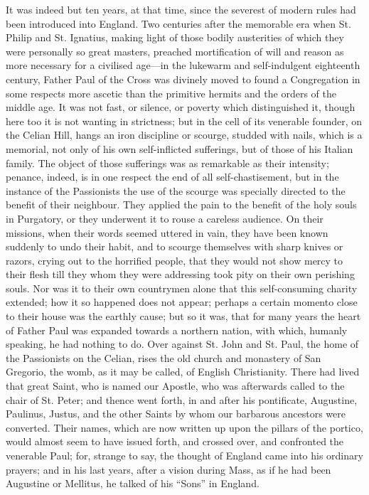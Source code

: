 It was indeed but ten years, at that time, since the severest of
modern rules had been introduced into England. Two centuries after the
memorable era when St. Philip and St. Ignatius, making light of those
bodily austerities of which they were personally so great masters,
preached mortification of will and reason as more necessary for a
civilised age—in the lukewarm and self-indulgent eighteenth century,
Father Paul of the Cross was divinely moved to found a Congregation in
some respects more ascetic than the primitive hermits and the orders
of the middle age. It was not fast, or silence, or poverty which
distinguished it, though here too it is not wanting in strictness; but
in the cell of its venerable founder, on the Celian Hill, hangs an
iron discipline or scourge, studded with nails, which is a memorial,
not only of his own self-inflicted sufferings, but of those of his
Italian family. The object of those sufferings was as remarkable as
their intensity; penance, indeed, is in one respect the end of all
self-chastisement, but in the instance of the Passionists the use of
the scourge was specially directed to the benefit of their neighbour.
They applied the pain to the benefit of the holy souls in Purgatory,
or they underwent it to rouse a careless audience. On their missions,
when their words seemed uttered in vain, they have been known
suddenly to undo their habit, and to scourge themselves with sharp
knives or razors, crying out to the horrified people, that they would
not show mercy to their flesh till they whom they were addressing took
pity on their own perishing souls. Nor was it to their own countrymen
alone that this self-consuming charity extended; how it so happened
does not appear; perhaps a certain momento close to their house was
the earthly cause; but so it was, that for many years the heart of
Father Paul was expanded towards a northern nation, with which,
humanly speaking, he had nothing to do. Over against St. John and St.
Paul, the home of the Passionists on the Celian, rises the old church
and monastery of San Gregorio, the womb, as it may be called, of
English Christianity. There had lived that great Saint, who is named
our Apostle, who was afterwards called to the chair of St. Peter; and
thence went forth, in and after his pontificate, Augustine, Paulinus,
Justus, and the other Saints by whom our barbarous ancestors were
converted. Their names, which are now written up upon the pillars of
the portico, would almost seem to have issued forth, and crossed over,
and confronted the venerable Paul; for, strange to say, the thought of
England came into his ordinary prayers; and in his last years, after a
vision during Mass, as if he had been Augustine or Mellitus, he talked
of his ``Sons'' in England.

